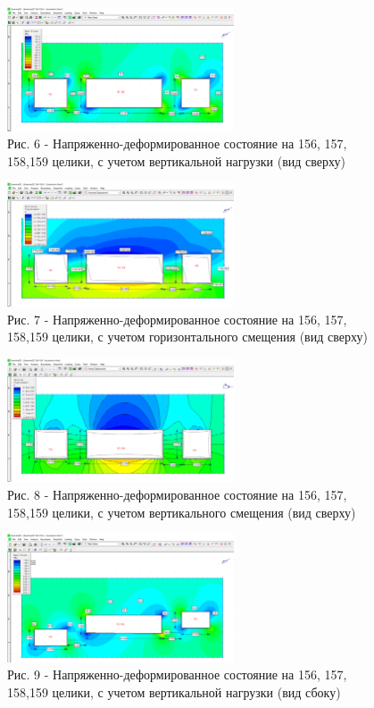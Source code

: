 \begin{figure}[H]
	\centering
	\includegraphics[width=0.6\textwidth]{media/gor/image10}
	\caption*{ Рис. 6 - Напряженно-деформированное состояние на 156, 157,
	158,159 целики, с учетом вертикальной нагрузки (вид сверху)}
\end{figure}

\begin{figure}[H]
	\centering
	\includegraphics[width=0.6\textwidth]{media/gor/image11}
	\caption*{Рис. 7 - Напряженно-деформированное состояние на 156, 157,
	158,159 целики, с учетом горизонтального смещения (вид сверху)}
\end{figure}

\begin{figure}[H]
	\centering
	\includegraphics[width=0.6\textwidth]{media/gor/image12}
	\caption*{Рис. 8 - Напряженно-деформированное состояние на 156, 157,
	158,159 целики, с учетом вертикального смещения (вид сверху)}
\end{figure}

\begin{figure}[H]
	\centering
	\includegraphics[width=0.6\textwidth]{media/gor/image13}
	\caption*{Рис. 9 - Напряженно-деформированное состояние на 156, 157,
	158,159 целики, с учетом вертикальной нагрузки (вид сбоку)}
\end{figure}


